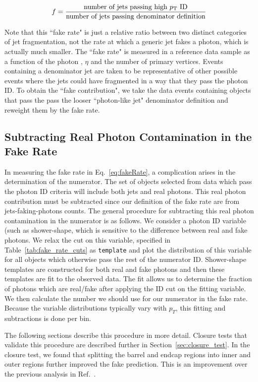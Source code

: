 \begin{equation} \label{eq:fakeRate}
f=\frac{\mbox{number of jets passing high \pt ID}}{\mbox{number of jets passing denominator definition}}
\end{equation}

Note that this ``fake rate" is just a relative ratio between two distinct categories of jet fragmentation, not the rate at which a generic jet fakes a photon, which is actually much smaller. The ``fake rate" is measured in a reference data sample as a function of the photon \pt, $\eta$ and the number of primary vertices. Events containing a denominator jet are taken to be representative of other possible events where the jets could have fragmented in a way that they pass the photon ID. To obtain the ``fake contribution", we take the data events containing objects that pass the pass the looser ``photon-like jet" denominator definition and reweight them by the fake rate. 

\subsection{Subtracting Real Photon Contamination in the Fake Rate}

In measuring the fake rate in Eq.~\ref{eq:fakeRate}, a complication arises in the determination of the numerator. The set of objects selected from data which pass the photon ID criteria will include both jets and real photons. This real photon contribution must be subtracted since our definition of the fake rate are from jets-faking-photons counts. The general procedure for subtracting this real photon contamination in the numerator is as follows. We consider a photon ID variable (such as shower-shape, \sieie which is sensitive to the difference between real and fake photons. We relax the cut on this variable, specified in Table~\ref{tab:fake_rate_cuts} as \texttt{template} and plot the distribution of this variable for all objects which otherwise pass the rest of the numerator ID. Shower-shape templates are constructed for both real and fake photons and then these templates are fit to the observed data. The fit allows us to determine the fraction of photons which are real/fake after applying the ID cut on the fitting variable. We then calculate the number we should use for our numerator in the fake rate. Because the variable distributions typically vary with $p_{T}$, this fitting and subtractions is done per \pt bin. 

The following sections describe this procedure in more detail. Closure tests that validate this procedure are described further in Section~\ref{sec:closure_test}. In the closure test, we found that splitting the barrel and endcap regions into inner and outer regions further improved the fake prediction. This is an improvement over the previous analysis in Ref.~\cite{cmsdiphoton2016}.

